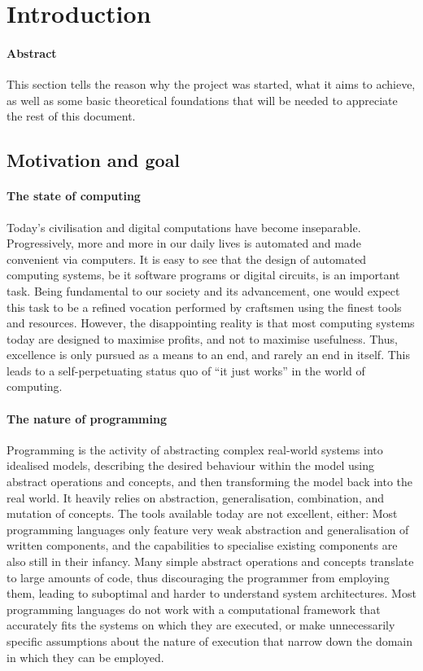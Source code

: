 \section{Introduction}
\paragraph{Abstract}
This section tells the reason why the {\tetra} project was started, what it aims to achieve, as well as some basic theoretical foundations that will be needed to appreciate the rest of this document.

\subsection{Motivation and goal\optional}

\paragraph{The state of computing}
Today's civilisation and digital computations have become inseparable.
Progressively, more and more in our daily lives is automated and made convenient via computers.
It is easy to see that the design of automated computing systems, be it software programs or digital circuits, is an important task.
Being fundamental to our society and its advancement, one would expect this task to be a refined vocation performed by craftsmen using the finest tools and resources.
However, the disappointing reality is that most computing systems today are designed to maximise profits, and not to maximise usefulness.
Thus, excellence is only pursued as a means to an end, and rarely an end in itself.
This leads to a self-perpetuating status quo of ``it just works'' in the world of computing.

\paragraph{The nature of programming}
Programming is the activity of abstracting complex real-world systems into idealised models, describing the desired behaviour within the model using abstract operations and concepts, and then transforming the model back into the real world.
It heavily relies on abstraction, generalisation, combination, and mutation of concepts.
The tools available today are not excellent, either:
	Most programming languages only feature very weak abstraction and generalisation of written components, and the capabilities to specialise existing components are also still in their infancy.
	Many simple abstract operations and concepts translate to large amounts of code, thus discouraging the programmer from employing them, leading to suboptimal and harder to understand system architectures.
	Most programming languages do not work with a computational framework that accurately fits the systems on which they are executed, or make unnecessarily specific assumptions about the nature of execution that narrow down the domain in which they can be employed.

